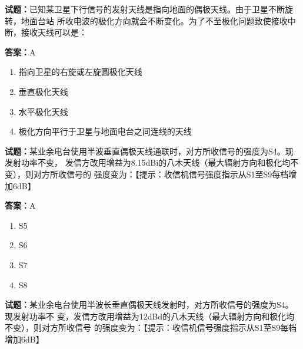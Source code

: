 \documentclass{ctexbook}
\begin{document}




\vspace{1em}

\textbf{试题：}已知某卫星下行信号的发射天线是指向地面的偶极天线。由于卫星不断旋转，地面台站
所收电波的极化方向就会不断变化。为了不至极化问题致使接收中断，接收天线可以是： 

\textbf{答案：}A 

\begin{enumerate}[leftmargin=3em]
  \item 指向卫星的右旋或左旋圆极化天线 

  \item 垂直极化天线 

  \item 水平极化天线 

  \item 极化方向平行于卫星与地面电台之间连线的天线 

\end{enumerate}





\vspace{1em}

\textbf{试题：}某业余电台使用半波垂直偶极天线通联时，对方所收信号的强度为S4。现发射功率不变，
发信方改用增益为8.15dBi的八木天线（最大辐射方向和极化均不变），则对方所收信号的
强度变为：【提示：收信机信号强度指示从S1至S9每档增加6dB】 

\textbf{答案：}A 

\begin{enumerate}[leftmargin=3em]
  \item S5 

  \item S6 

  \item S7 

  \item S8 

\end{enumerate}





\vspace{1em}

\textbf{试题：}某业余电台使用半波长垂直偶极天线发射时，对方所收信号的强度为S4。现发射功率不
变，发信方改用增益为12dBd的八木天线（最大辐射方向和极化均不变），则对方所收信号
的强度变为：【提示：收信机信号强度指示从S1至S9每档增加6dB】 
\end{document}
